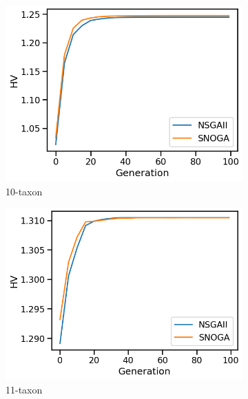 \begin{figure}[!htbp]
	\centering
\begin{subfigure}[b]{0.33\textwidth}
			\includegraphics[width=\textwidth]{Figure/10-taxon_hv}
			\caption{10-taxon}
\end{subfigure}\begin{subfigure}[b]{0.33\textwidth}
			\includegraphics[width=\textwidth]{Figure/11-taxon_hv}
			\caption{11-taxon}
\end{subfigure}\begin{subfigure}[b]{0.33\textwidth}

\end{subfigure}
\end{figure}
